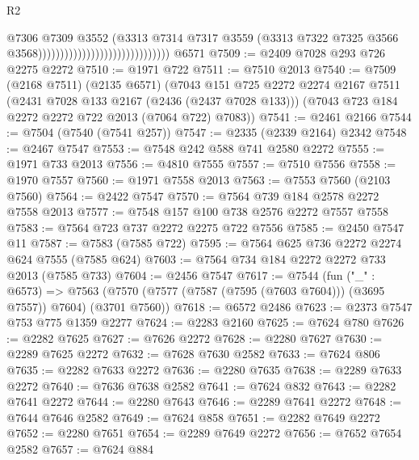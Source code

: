 \begin{lexlean}{R2}
\begin{coremodule}
                                                            @7306
                                                            @7309
                                                            @3552
                                                            (@3313
                                                              @7314
                                                              @7317
                                                              @3559
                                                              (@3313
                                                                @7322
                                                                @7325
                                                                @3566
                                                                @3568))))))))))))))))))))))))))))))
    @6571
@7509 := @2409 @7028 @293 @726 @2275 @2272
@7510 := @1971 @722
@7511 := @7510 @2013
@7540 := @7509
    (@2168 @7511)
    (@2135 @6571)
    (@7043
      @151
      @725
      @2272
      @2274
      @2167
      @7511
      (@2431 @7028 @133 @2167 (@2436 (@2437 @7028 @133)))
      (@7043 @723 @184 @2272 @2272 @722 @2013 (@7064 @722) @7083))
@7541 := @2461 @2166
@7544 := @7504 (@7540 (@7541 @257))
@7547 := @2335 (@2339 @2164) @2342
@7548 := @2467 @7547
@7553 := @7548 @242 @588 @741 @2580 @2272
@7555 := @1971 @733 @2013
@7556 := @4810 @7555
@7557 := @7510 @7556
@7558 := @1970 @7557
@7560 := @1971 @7558 @2013
@7563 := @7553 @7560 (@2103 @7560)
@7564 := @2422 @7547
@7570 := @7564 @739 @184 @2578 @2272 @7558 @2013
@7577 := @7548 @157 @100 @738 @2576 @2272 @7557 @7558
@7583 := @7564 @723 @737 @2272 @2275 @722 @7556
@7585 := @2450 @7547 @11
@7587 := @7583 (@7585 @722)
@7595 := @7564 @625 @736 @2272 @2274 @624 @7555 (@7585 @624)
@7603 := @7564 @734 @184 @2272 @2272 @733 @2013 (@7585 @733)
@7604 := @2456 @7547
@7617 := @7544
    (fun ("_" : @6573) =>
    @7563 (@7570 (@7577 (@7587 (@7595 (@7603 @7604))) (@3695 @7557)) @7604) (@3701 @7560))
@7618 := @6572 @2486
@7623 := @2373 @7547 @753 @775 @1359 @2277
@7624 := @2283 @2160
@7625 := @7624 @780
@7626 := @2282 @7625
@7627 := @7626 @2272
@7628 := @2280 @7627
@7630 := @2289 @7625 @2272
@7632 := @7628 @7630 @2582
@7633 := @7624 @806
@7635 := @2282 @7633 @2272
@7636 := @2280 @7635
@7638 := @2289 @7633 @2272
@7640 := @7636 @7638 @2582
@7641 := @7624 @832
@7643 := @2282 @7641 @2272
@7644 := @2280 @7643
@7646 := @2289 @7641 @2272
@7648 := @7644 @7646 @2582
@7649 := @7624 @858
@7651 := @2282 @7649 @2272
@7652 := @2280 @7651
@7654 := @2289 @7649 @2272
@7656 := @7652 @7654 @2582
@7657 := @7624 @884

\end{coremodule}
\end{lexlean}
